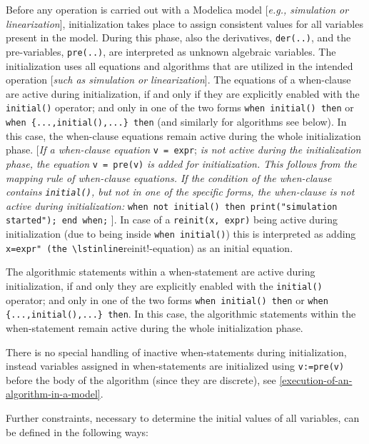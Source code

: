 Before any operation is carried out with a Modelica model {[}\emph{e.g.,
simulation or linearization}{]}, initialization takes place to assign
consistent values for all variables present in the model. During this
phase, also the derivatives, \lstinline!der(..)!, and the pre-variables, \lstinline!pre(..)!,
are interpreted as unknown algebraic variables. The initialization uses
all equations and algorithms that are utilized in the intended operation
{[}\emph{such as simulation or linearization}{]}. The equations of a
when-clause are active during initialization, if and only if they are
explicitly enabled with the \lstinline!initial()! operator; and only in one of the
two forms \lstinline!when initial() then! or \lstinline!when {...,initial(),...} then!
(and similarly for algorithms see below). In this case, the when-clause equations remain active during the
whole initialization phase. {[}\emph{If a when-clause equation} \lstinline!v = expr!; \emph{is not active during the initialization phase, the equation}
\lstinline!v = pre(v)! \emph{is added for initialization. This follows from the
mapping rule of when-clause equations. If the condition of the
when-clause contains \lstinline!initial()!, but not in one of the specific forms,
the when-clause is not active during initialization:} \lstinline!when not
initial() then print("simulation started"); end when;! {]}. In case of a
\lstinline!reinit(x, expr)! being active during initialization (due to being inside
\lstinline!when initial()!) this is interpreted as adding \lstinline!x=expr" (the
\lstinline!reinit!-equation) as an initial equation.

The algorithmic statements within a when-statement are active during initialization, if and only they are
explicitly enabled with the \lstinline!initial()! operator; and only in one of the
two forms \lstinline!when initial() then! or \lstinline!when {...,initial(),...} then!.
In this case, the algorithmic statements within the when-statement remain active during the whole initialization phase.

\begin{nonnormative}
There is no special handling of inactive when-statements during initialization, instead
variables assigned in when-statements are initialized using \lstinline!v:=pre(v)!
before the body of the algorithm (since they are discrete), see \autoref{execution-of-an-algorithm-in-a-model}.
\end{nonnormative}

Further constraints, necessary to determine the initial values of all
variables, can be defined in the following ways:

